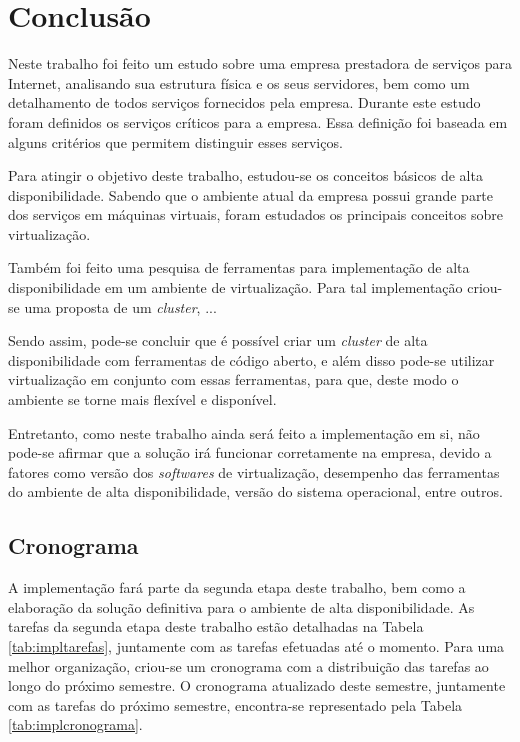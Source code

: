 \chapter{Conclusão}
\label{cap:conclusao}

Neste trabalho foi feito um estudo sobre uma empresa prestadora de serviços para Internet, analisando sua estrutura física e os seus servidores, 
bem como um detalhamento de todos serviços fornecidos pela empresa. Durante este estudo foram definidos os serviços críticos para a empresa.
Essa definição foi baseada em alguns critérios que permitem distinguir esses serviços.

Para atingir o objetivo deste trabalho, estudou-se os conceitos básicos de alta disponibilidade. Sabendo que o ambiente atual da empresa possui 
grande parte dos serviços em máquinas virtuais, foram estudados os principais conceitos sobre virtualização.

Também foi feito uma pesquisa de ferramentas para implementação de alta disponibilidade em um ambiente de virtualização. Para tal implementação
criou-se uma proposta de um \textit{cluster}, ...

Sendo assim, pode-se concluir que é possível criar um \textit{cluster} de alta disponibilidade com ferramentas de código aberto, e além disso 
pode-se utilizar virtualização em conjunto com essas ferramentas, para que, deste modo o ambiente se torne mais flexível e disponível. 

Entretanto, como neste trabalho ainda será feito a implementação em si, não pode-se afirmar que a solução irá funcionar corretamente
na empresa, devido a fatores como versão dos \textit{softwares} de virtualização, desempenho das ferramentas do ambiente de alta disponibilidade, 
versão do sistema operacional, entre outros.

\newpage
\section{Cronograma}
\label{section:cronograma}

A implementação fará parte da segunda etapa deste trabalho, bem como a elaboração da solução definitiva para o ambiente de alta disponibilidade. 
As tarefas da segunda etapa deste trabalho estão detalhadas na Tabela \ref{tab:impltarefas}, juntamente com as tarefas efetuadas até o momento. 
Para uma melhor organização, criou-se um cronograma com a distribuição das tarefas ao longo do próximo semestre. O cronograma atualizado 
deste semestre, juntamente com as tarefas do próximo semestre, encontra-se representado pela Tabela \ref{tab:implcronograma}.

